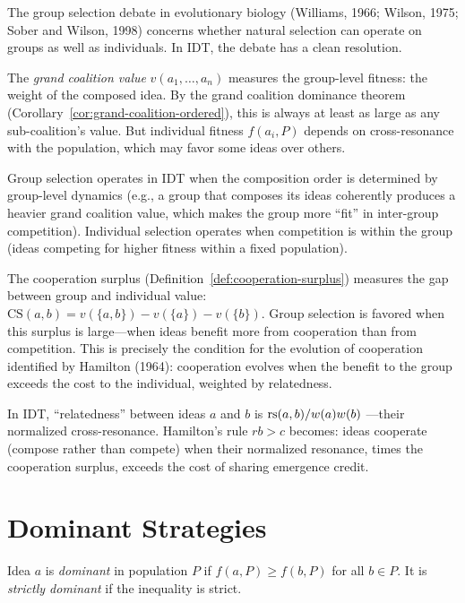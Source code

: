 \begin{remark}
\label{rem:group-selection}
The group selection debate in evolutionary biology (Williams, 1966; Wilson,
1975; Sober and Wilson, 1998) concerns whether natural selection can operate
on groups as well as individuals.  In IDT, the debate has a clean resolution.

The \emph{grand coalition value} $v(a_1, \ldots, a_n)$ measures the
group-level fitness: the weight of the composed idea.  By the grand
coalition dominance theorem (Corollary~\ref{cor:grand-coalition-ordered}), this is
always at least as large as any sub-coalition's value.  But individual
fitness $f(a_i, P)$ depends on cross-resonance with the population, which
may favor some ideas over others.

Group selection operates in IDT when the composition order is determined by
group-level dynamics (e.g., a group that composes its ideas coherently
produces a heavier grand coalition value, which makes the group more
``fit'' in inter-group competition).  Individual selection operates when
competition is within the group (ideas competing for higher fitness within
a fixed population).

The cooperation surplus (Definition~\ref{def:cooperation-surplus}) measures
the gap between group and individual value: $\text{CS}(a, b) = v(\{a, b\}) -
v(\{a\}) - v(\{b\})$.  Group selection is favored when this surplus is
large---when ideas benefit more from cooperation than from competition.
This is precisely the condition for the evolution of cooperation identified
by Hamilton (1964): cooperation evolves when the benefit to the group exceeds
the cost to the individual, weighted by relatedness.

In IDT, ``relatedness'' between ideas $a$ and $b$ is $\mathrm{rs}(a, b) / w(a) w(b)$
---their normalized cross-resonance.  Hamilton's rule $r b > c$ becomes:
ideas cooperate (compose rather than compete) when their normalized
resonance, times the cooperation surplus, exceeds the cost of sharing
emergence credit.
\end{remark}


\section{Dominant Strategies}

\begin{definition}
\label{def:dominant}
Idea $a$ is \emph{dominant} in population $P$ if $f(a, P) \geq f(b, P)$
for all $b \in P$.  It is \emph{strictly dominant} if the inequality is
strict.
\end{definition}

